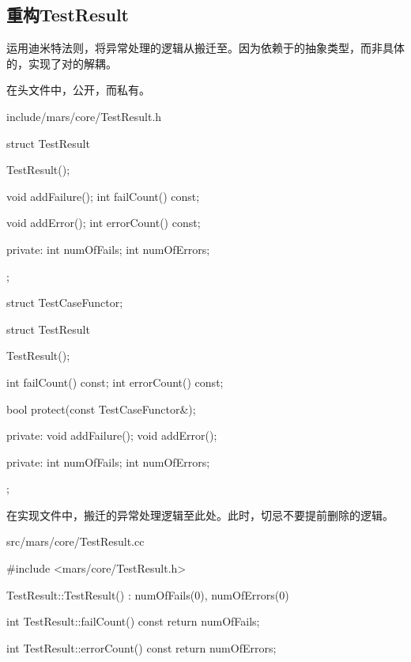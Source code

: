 \begin{content}

\subsection{重构TestResult}

运用迪米特法则，将异常处理的逻辑从搬迁至。因为依赖于的抽象类型，而非具体的，实现了对的解耦。

在头文件中，公开，而私有。

\begin{diff}{include/mars/core/TestResult.h}
 \begin{minicpp}
struct TestResult {
  TestResult();

  void addFailure();
  int failCount() const;

  void addError();
  int errorCount() const;

private:
  int numOfFails;
  int numOfErrors;
};
 \end{minicpp}
\tcblower 
 \begin{minicpp}
struct TestCaseFunctor;

struct TestResult {
  TestResult();

  int failCount() const;
  int errorCount() const;

  bool protect(const TestCaseFunctor&);

private:
  void addFailure();
  void addError();

private:
  int numOfFails;
  int numOfErrors;
};
 \end{minicpp}
\end{diff}

在实现文件中，搬迁的异常处理逻辑至此处。此时，切忌不要提前删除的逻辑。

\begin{diff}{src/mars/core/TestResult.cc}
 \begin{minicpp}
#include <mars/core/TestResult.h>

TestResult::TestResult()
  : numOfFails(0), numOfErrors(0) {
}

int TestResult::failCount() const {
  return numOfFails;
}

int TestResult::errorCount() const {
  return numOfErrors;
}


\end{minicpp}
\end{diff}
\end{content}
